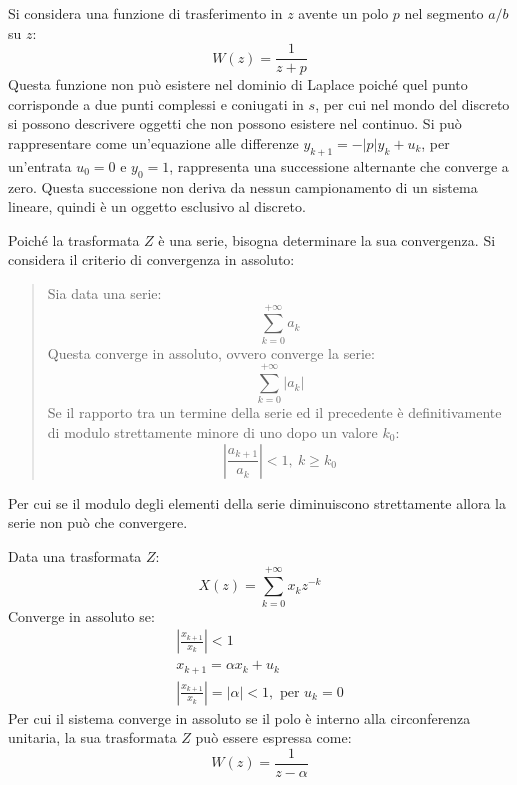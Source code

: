 \documentclass{article}
\numberwithin{equation}{subsection}
\begin{document}
Si considera una funzione di trasferimento in $z$ avente un polo $p$ nel segmento $a/b$ su $z$:
\begin{equation*}
    W(z)=\displaystyle\frac{1}{z+p}
\end{equation*}
Questa funzione non può esistere nel dominio di Laplace poiché quel punto corrisponde a due punti complessi e coniugati in $s$, per cui nel mondo del discreto si possono 
descrivere oggetti che non possono esistere nel continuo. Si può rappresentare come un'equazione alle differenze $y_{k+1}=-|p|y_k+u_k$, per un'entrata $u_0=0$ e $y_0=1$, 
rappresenta una successione alternante che converge a zero. Questa successione non deriva da nessun campionamento di un sistema lineare, quindi è un oggetto 
esclusivo al discreto. 

Poiché la trasformata $Z$ è una serie, bisogna determinare la sua convergenza. Si considera il criterio di convergenza in assoluto:
\begin{quotation}
    Sia data una serie: 
    \begin{equation*}
        \displaystyle\sum_{k=0}^{+\infty}a_k
    \end{equation*}
    Questa converge in assoluto, ovvero converge la serie: 
    \begin{equation*}
        \displaystyle\sum_{k=0}^{+\infty}|a_k|
    \end{equation*}
    Se il rapporto tra un termine della serie ed il precedente 
    è definitivamente di modulo strettamente minore di uno dopo un valore $k_0$: 
    \begin{equation}
        \displaystyle\left|\frac{a_{k+1}}{a_k}\right|<1,\:k\geq k_0
    \end{equation}
\end{quotation}
Per cui se il modulo degli elementi della serie diminuiscono strettamente allora la serie non può che convergere. 

Data una trasformata $Z$:
\begin{equation*}
    X(z)=\displaystyle\sum_{k=0}^{+\infty}x_kz^{-k}
\end{equation*}
Converge in assoluto se:
\begin{gather*}
    \left|\displaystyle\frac{x_{k+1}}{x_k}\right|<1\\
    x_{k+1}=\alpha x_k+u_k\\
    \left|\displaystyle\frac{x_{k+1}}{x_k}\right|=|\alpha|<1,\mbox{ per }u_k=0
\end{gather*}
Per cui il sistema converge in assoluto se il polo è interno alla circonferenza unitaria, la sua trasformata $Z$ può essere espressa come:
\begin{equation}
    W(z)=\displaystyle\frac{1}{z-\alpha}
\end{equation}
\end{document}
